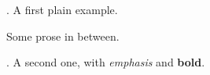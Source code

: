 \documentclass{article}
\begin{document}
\ex. A first plain example.

Some prose in between.

\ex. A second one, with \emph{emphasis} and \textbf{bold}.
\end{document}
